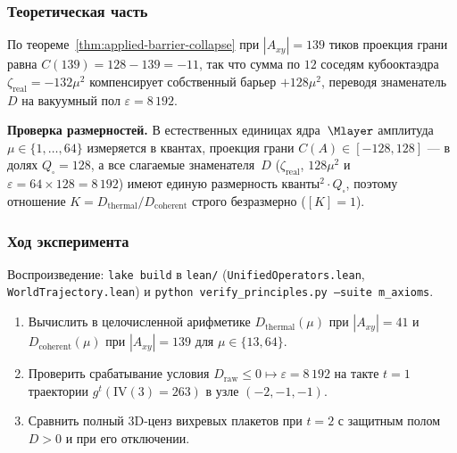 \subsubsection*{Теоретическая часть}
По теореме~\ref{thm:applied-barrier-collapse} при $|A_{xy}| = 139$ тиков проекция грани равна $C(139) = 128 - 139 = -11$, так что сумма по $12$ соседям кубооктаэдра $\zeta_{\mathrm{real}} = -132\mu^2$ компенсирует собственный барьер $+128\mu^2$, переводя знаменатель~$D$ на вакуумный пол $\varepsilon = 8\,192$.

\textbf{Проверка размерностей.}
В естественных единицах ядра~$\Mlayer$ амплитуда $\mu\in\{1,\dots,64\}$ измеряется в квантах, проекция грани $C(A)\in[-128,128]$ --- в долях $Q_\square=128$, а все слагаемые знаменателя~$D$ ($\zeta_{\mathrm{real}}$, $128\mu^2$ и $\varepsilon = 64\times 128 = 8\,192$) имеют единую размерность $\mathrm{кванты}^2\cdot Q_\square$, поэтому отношение $K = D_{\mathrm{thermal}}/D_{\mathrm{coherent}}$ строго безразмерно ($[K] = 1$).

\subsubsection*{Ход эксперимента}
{\sloppy Воспроизведение: \texttt{lake build} в \texttt{lean/} (\texttt{UnifiedOperators.lean}, \texttt{WorldTrajectory.lean}) и \texttt{python verify\_principles.py --suite m\_axioms}.\par}

\begin{enumerate}[label=\textbf{Шаг \arabic*:},leftmargin=*,itemsep=0.35em]
\item Вычислить в целочисленной арифметике $D_{\mathrm{thermal}}(\mu)$ при $|A_{xy}|=41$ и $D_{\mathrm{coherent}}(\mu)$ при $|A_{xy}|=139$ для $\mu\in\{13, 64\}$.
\item Проверить срабатывание условия $D_{\mathrm{raw}} \le 0 \mapsto \varepsilon = 8\,192$ на такте $t=1$ траектории $g^t(\mathrm{IV}(3)=263)$ в узле $(-2,-1,-1)$.
\item Сравнить полный 3D-ценз вихревых плакетов при $t=2$ с защитным полом $D>0$ и при его отключении.
\end{enumerate}

